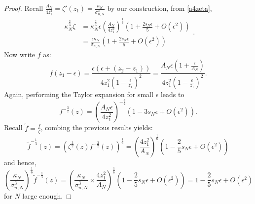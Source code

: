 \documentclass[10pt,a4paper]{amsart}
\begin{document}
\begin{proof}
Recall $\frac{A_N}{4z_1^2}=\zeta'(z_1)=\frac{\kappa_N}{\sigma_{n,N}^3}$ by our construction, from \eqref{a4zeta},
\begin{equation*}
    \begin{split}
        \kappa_N^{\frac{2}{3}}\zeta&=\kappa_N^{\frac{2}{3}}\epsilon\left(\frac{A_N}{4z_1^2}\right)^\frac{1}{3}\left(1+\frac{2s_N\epsilon}{5}+O(\epsilon^2)\right)\\
        &=\frac{\epsilon\kappa_N}{\sigma_{n,N}}\left(1+\frac{2s_N\epsilon}{5}+O(\epsilon^2)\right)
    \end{split}.
\end{equation*}
Now write $f$ as:
\begin{equation*}
    f(z_1-\epsilon)=\frac{\epsilon(\epsilon+(z_2-z_1))}{4z_1^2(1-\frac{\epsilon}{z_1})^2}=\frac{A_N\epsilon(1+\frac{\epsilon}{A_N})}{4z_1^2(1-\frac{\epsilon}{z_1})^2}.
\end{equation*}
Again, performing the Taylor expansion for small $\epsilon$ leads to
\begin{equation*}
    f^{-\frac{3}{2}}(z)=\left(\frac{A_N\epsilon}{4z_1^2}\right)^{-\frac{3}{2}}\left(1-3s_N\epsilon+O(\epsilon^2)\right).
\end{equation*}
Recall $\tilde{f}=\frac{f}{\zeta}$, combing the previous results yields:
\begin{equation*}
    \tilde{f}^{-\frac{1}{4}}(z)=\left(\zeta^{\frac{3}{2}}(z)f^{-\frac{3}{2}}(z)\right)^{\frac{1}{6}}=\left(\frac{4z_1^2}{A_N}\right)^{\frac{1}{6}}\left(1-\frac{2}{5}s_N\epsilon+O(\epsilon^2)\right)
\end{equation*}
and hence,
\begin{equation*}
    \left(\frac{\kappa_N}{\sigma^3_{n,N}}\right)^{\frac{1}{6}}\tilde{f}^{-\frac{1}{4}}(z)=\left(\frac{\kappa_N}{\sigma^3_{n,N}}\times\frac{4z_1^2}{A_N}\right)^{\frac{1}{6}}\left(1-\frac{2}{5}s_N\epsilon+O(\epsilon^2)\right)=1-\frac{2}{5}s_N\epsilon+O(\epsilon^2)
\end{equation*}
for $N$ large enough.\end{proof}
\end{document}
